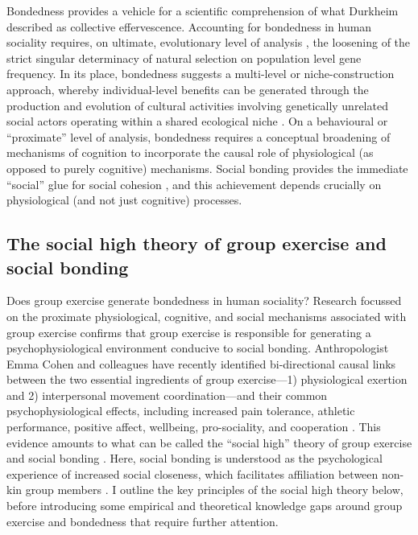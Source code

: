 \begin{CJK}{UTF8}{gbsn}
Bondedness provides a vehicle for a scientific comprehension of what Durkheim described as collective effervescence.  Accounting for bondedness in human sociality requires, on ultimate, evolutionary level of analysis \citep[see][]{Mayr1961,Tinbergen1963}, the loosening of the strict singular determinacy of natural selection on population level gene frequency.  In its place, bondedness suggests a multi-level or niche-construction approach, whereby individual-level benefits can be generated through the production and evolution of cultural activities involving genetically unrelated social actors operating within a shared ecological niche \citep{Dunbar2012,Laland2010,Laland2015}.  On a behavioural or ``proximate'' level of analysis, bondedness requires a conceptual broadening of mechanisms of cognition to incorporate the causal role of physiological (as opposed to purely cognitive) mechanisms.  Social bonding provides the immediate ``social'' glue for social cohesion \citep[see][]{Lakin2003,Bastian2014a}, and this achievement depends crucially on physiological (and not just cognitive) processes.

\subsection{The social high theory of group exercise and social bonding \label{sect:socialHigh}}

Does group exercise generate bondedness in human sociality?  Research focussed on the proximate physiological, cognitive, and social mechanisms associated with group exercise confirms that group exercise is responsible for generating a psychophysiological environment conducive to social bonding.  Anthropologist Emma Cohen and colleagues have recently identified bi-directional causal links between the two essential ingredients of group exercise---1) physiological exertion and 2) interpersonal movement coordination---and their common psychophysiological effects, including increased pain tolerance, athletic performance, positive affect, wellbeing, pro-sociality, and cooperation \citep{Davis2015}.  This evidence amounts to what can be called the ``social high'' theory of group exercise and social bonding \citep[hereafter ``the social high theory,'' see][]{Cohen2017}. Here, social bonding is understood as the psychological experience of increased social closeness, which facilitates affiliation between non-kin group members \citep{Tarr2014}.  I outline the key principles of the social high theory below, before introducing some empirical and theoretical knowledge gaps around group exercise and bondedness that require further attention.


\end{CJK}
